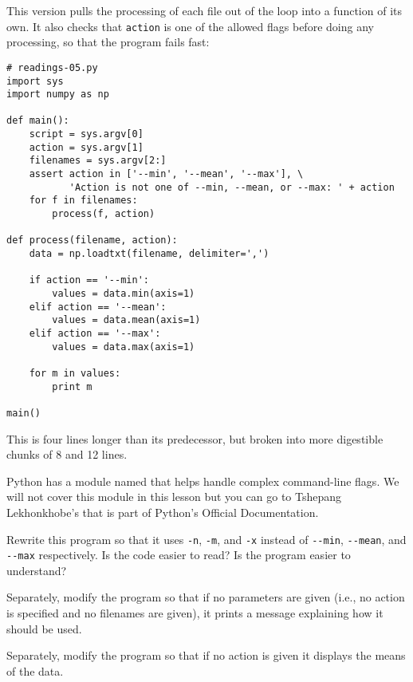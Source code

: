 \documentclass{book}
\begin{document}
This version pulls the processing of each file out of the loop into a
function of its own. It also checks that \texttt{action} is one of the
allowed flags before doing any processing, so that the program fails
fast:

\begin{Verbatim}
# readings-05.py
import sys
import numpy as np

def main():
    script = sys.argv[0]
    action = sys.argv[1]
    filenames = sys.argv[2:]
    assert action in ['--min', '--mean', '--max'], \
           'Action is not one of --min, --mean, or --max: ' + action
    for f in filenames:
        process(f, action)

def process(filename, action):
    data = np.loadtxt(filename, delimiter=',')

    if action == '--min':
        values = data.min(axis=1)
    elif action == '--mean':
        values = data.mean(axis=1)
    elif action == '--max':
        values = data.max(axis=1)

    for m in values:
        print m

main()
\end{Verbatim}

This is four lines longer than its predecessor, but broken into more
digestible chunks of 8 and 12 lines.

Python has a module named
 that
helps handle complex command-line flags. We will not cover this module
in this lesson but you can go to Tshepang Lekhonkhobe's
that is part of Python's Official Documentation.

\begin{challenge}
  Rewrite this program so that it uses \texttt{-n}, \texttt{-m}, and
  \texttt{-x} instead of \texttt{-{}-min}, \texttt{-{}-mean}, and
  \texttt{-{}-max} respectively. Is the code easier to read? Is the
  program easier to understand?
\end{challenge}

\begin{challenge}
  Separately, modify the program so that if no parameters are given
  (i.e., no action is specified and no filenames are given), it prints a
  message explaining how it should be used.
\end{challenge}

\begin{challenge}
  Separately, modify the program so that if no action is given it
  displays the means of the data.
\end{challenge}
\end{document}
